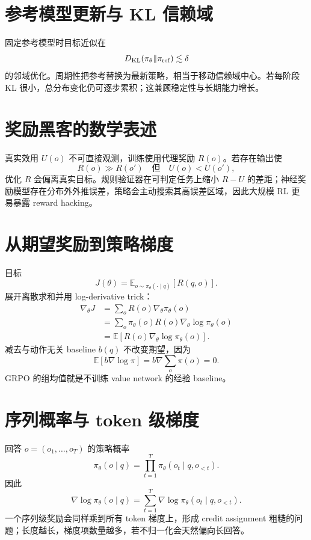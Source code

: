 \documentclass[UTF8,12pt,a4paper,fontset=none]{ctexart}
\numberwithin{equation}{section}
\newcommand{\E}{\mathbb{E}}
\newcommand{\KL}{D_{\mathrm{KL}}}
\begin{document}
\section{参考模型更新与 KL 信赖域}
固定参考模型时目标近似在
\begin{equation}
 \KL(\pi_\theta\Vert\pi_{\rm ref})\lesssim\delta
\end{equation}
的邻域优化。周期性把参考替换为最新策略，相当于移动信赖域中心。若每阶段 KL 很小，总分布变化仍可逐步累积；这兼顾稳定性与长期能力增长。

\section{奖励黑客的数学表述}
真实效用 $U(o)$ 不可直接观测，训练使用代理奖励 $R(o)$。若存在输出使
\begin{equation}
 R(o)\gg R(o')\quad\text{但}\quad U(o)<U(o'),
\end{equation}
优化 $R$ 会偏离真实目标。规则验证器在可判定任务上缩小 $R-U$ 的差距；神经奖励模型存在分布外外推误差，策略会主动搜索其高误差区域，因此大规模 RL 更易暴露 reward hacking。

\section{从期望奖励到策略梯度}
目标
\begin{equation}
 J(\theta)=\E_{o\sim\pi_\theta(\cdot\mid q)}[R(q,o)].
\end{equation}
展开离散求和并用 log-derivative trick：
\begin{align}
 \nabla_\theta J
 &=\sum_oR(o)\nabla_\theta\pi_\theta(o)\\
 &=\sum_o\pi_\theta(o)R(o)\nabla_\theta\log\pi_\theta(o)\\
 &=\E[R(o)\nabla_\theta\log\pi_\theta(o)].
\end{align}
减去与动作无关 baseline $b(q)$ 不改变期望，因为
\begin{equation}
 \E[b\nabla\log\pi]=b\nabla\sum_o\pi(o)=0.
\end{equation}
GRPO 的组均值就是不训练 value network 的经验 baseline。

\section{序列概率与 token 级梯度}
回答 $o=(o_1,\ldots,o_T)$ 的策略概率
\begin{equation}
 \pi_\theta(o\mid q)=\prod_{t=1}^{T}\pi_\theta(o_t\mid q,o_{<t}).
\end{equation}
因此
\begin{equation}
 \nabla\log\pi_\theta(o\mid q)
 =\sum_{t=1}^{T}\nabla\log\pi_\theta(o_t\mid q,o_{<t}).
\end{equation}
一个序列级奖励会同样乘到所有 token 梯度上，形成 credit assignment 粗糙的问题；长度越长，梯度项数量越多，若不归一化会天然偏向长回答。
\end{document}
